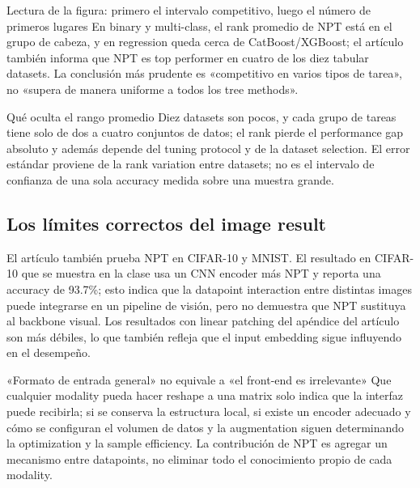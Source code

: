\begin{knowledgebox}{Lectura de la figura: primero el intervalo competitivo, luego el número de primeros lugares}
En binary y multi-class, el rank promedio de NPT está en el grupo de cabeza, y en regression queda cerca de CatBoost/XGBoost; el artículo también informa que NPT es top performer en cuatro de los diez tabular datasets. La conclusión más prudente es «competitivo en varios tipos de tarea», no «supera de manera uniforme a todos los tree methods».
\end{knowledgebox}

\begin{warningbox}{Qué oculta el rango promedio}
Diez datasets son pocos, y cada grupo de tareas tiene solo de dos a cuatro conjuntos de datos; el rank pierde el performance gap absoluto y además depende del tuning protocol y de la dataset selection. El error estándar proviene de la rank variation entre datasets; no es el intervalo de confianza de una sola accuracy medida sobre una muestra grande.
\end{warningbox}


\subsection{Los límites correctos del image result}

El artículo también prueba NPT en CIFAR-10 y MNIST. El resultado en CIFAR-10 que se muestra en la clase usa un CNN encoder más NPT y reporta una accuracy de 93.7\%; esto indica que la datapoint interaction entre distintas images puede integrarse en un pipeline de visión, pero no demuestra que NPT sustituya al backbone visual. Los resultados con linear patching del apéndice del artículo son más débiles, lo que también refleja que el input embedding sigue influyendo en el desempeño.

\begin{warningbox}{«Formato de entrada general» no equivale a «el front-end es irrelevante»}
Que cualquier modality pueda hacer reshape a una matrix solo indica que la interfaz puede recibirla; si se conserva la estructura local, si existe un encoder adecuado y cómo se configuran el volumen de datos y la augmentation siguen determinando la optimization y la sample efficiency. La contribución de NPT es agregar un mecanismo entre datapoints, no eliminar todo el conocimiento propio de cada modality.
\end{warningbox}

